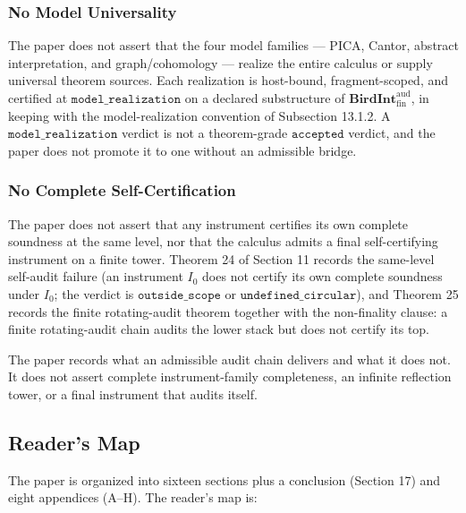 \documentclass[11pt]{article}
\theoremstyle{definition}
\begin{document}
\subsubsection{No Model Universality}

The paper does not assert that the four model families --- PICA, Cantor, abstract interpretation, and graph/cohomology --- realize the entire calculus or supply universal theorem sources. Each realization is host-bound, fragment-scoped, and certified at \(\texttt{model\_realization}\) on a declared substructure of \(\mathbf{BirdInt}^{\mathrm{aud}}_{\mathrm{fin}}\), in keeping with the model-realization convention of Subsection 13.1.2. A \(\texttt{model\_realization}\) verdict is not a theorem-grade \(\texttt{accepted}\) verdict, and the paper does not promote it to one without an admissible bridge.

\subsubsection{No Complete Self-Certification}

The paper does not assert that any instrument certifies its own complete soundness at the same level, nor that the calculus admits a final self-certifying instrument on a finite tower. Theorem 24 of Section 11 records the same-level self-audit failure (an instrument \(I_{0}\) does not certify its own complete soundness under \(I_0\); the verdict is \(\texttt{outside\_scope}\) or \(\texttt{undefined\_circular}\)), and Theorem 25 records the finite rotating-audit theorem together with the non-finality clause: a finite rotating-audit chain audits the lower stack but does not certify its top.

The paper records what an admissible audit chain delivers and what it does not. It does not assert complete instrument-family completeness, an infinite reflection tower, or a final instrument that audits itself.

\subsection{Reader's Map}

The paper is organized into sixteen sections plus a conclusion (Section 17) and eight appendices (A--H). The reader's map is:
\end{document}
